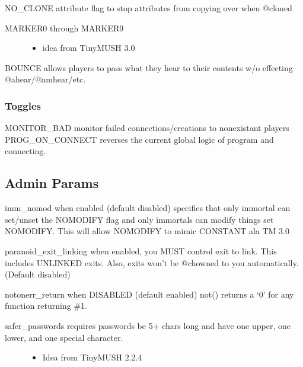 \documentclass[letterpaper,10pt,english]{sphinxmanual}
\begin{document}
\sphinxAtStartPar
NO\_CLONE \sphinxhyphen{} attribute flag to stop attributes from copying over when @cloned
\begin{description}
\item[{MARKER0 through MARKER9}] \leavevmode\begin{itemize}
\item {} 
\sphinxAtStartPar
idea from TinyMUSH 3.0

\end{itemize}

\end{description}

\sphinxAtStartPar
BOUNCE \sphinxhyphen{} allows players to pass what they hear to their contents w/o effecting @ahear/@amhear/etc.


\subsubsection{Toggles}
\label{\detokenize{changelog:id64}}
\sphinxAtStartPar
MONITOR\_BAD \sphinxhyphen{} monitor failed connections/creations to non\sphinxhyphen{}existant players
PROG\_ON\_CONNECT \sphinxhyphen{} reverses the current global logic of program and connecting.


\subsection{Admin Params}
\label{\detokenize{changelog:id65}}
\sphinxAtStartPar
imm\_nomod \sphinxhyphen{} when enabled (default disabled) specifies that only immortal can set/unset the NOMODIFY flag and only immortals can modify things set NOMODIFY.  This will allow NOMODIFY to mimic CONSTANT ala TM 3.0

\sphinxAtStartPar
paranoid\_exit\_linking \sphinxhyphen{} when enabled, you MUST control exit to link.  This includes UNLINKED exits.  Also, exits won’t be @chowned to you automatically. (Default disabled)

\sphinxAtStartPar
notonerr\_return \sphinxhyphen{} when DISABLED (default enabled) not() returns a ‘0’ for any function returning \#\sphinxhyphen{}1.
\begin{description}
\item[{safer\_passwords \sphinxhyphen{} requires passwords be 5+ chars long and have one upper, one lower, and one special character.}] \leavevmode\begin{itemize}
\item {} 
\sphinxAtStartPar
Idea from TinyMUSH 2.2.4

\end{itemize}

\end{description}
\end{document}
